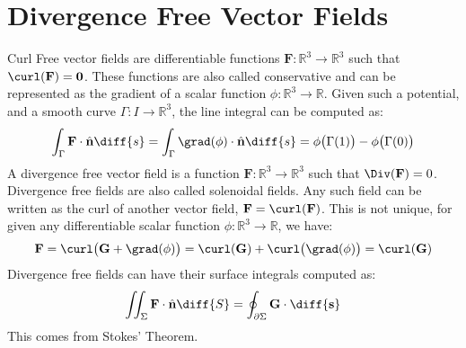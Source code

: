 \documentclass[crop=false,class=book,oneside]{standalone}
\begin{document}
    \section{Divergence Free Vector Fields}
        Curl Free vector fields are differentiable functions
        $\mathbf{F}:\mathbb{R}^{3}\rightarrow\mathbb{R}^{3}$ such
        that $\curl(\mathbf{F})=\mathbf{0}$. These functions are
        also called conservative and can be represented as the
        gradient of a scalar function
        $\phi:\mathbb{R}^{3}\rightarrow\mathbb{R}$. Given such a
        potential, and a smooth curve
        $\Gamma:I\rightarrow\mathbb{R}^{3}$, the line integral
        can be computed as:
        \begin{equation}
            \int_{\Gamma}\mathbf{F}\cdot\hat{\mathbf{n}}\diff{s}
            =\int_{\Gamma}\grad(\phi)\cdot\hat{\mathbf{n}}\diff{s}
            =\phi\big(\Gamma(1)\big)-\phi\big(\Gamma(0)\big)
        \end{equation}
        A divergence free vector field is a function
        $\mathbf{F}:\mathbb{R}^{3}\rightarrow\mathbb{R}^{3}$ such
        that $\Div(\mathbf{F})=0$. Divergence free fields are also
        called solenoidal fields. Any such field can be written
        as the curl of another vector field,
        $\mathbf{F}=\curl(\mathbf{F})$. This is not unique, for given
        any differentiable scalar function
        $\phi:\mathbb{R}^{3}\rightarrow\mathbb{R}$, we have:
        \begin{equation}
            \mathbf{F}=\curl\big(\mathbf{G}+\grad(\phi)\big)
                =\curl(\mathbf{G})+\curl\big(\grad(\phi)\big)
                =\curl(\mathbf{G})
        \end{equation}
        Divergence free fields can have their surface integrals
        computed as:
        \begin{equation}
            \iint_{\Sigma}\mathbf{F}\cdot\hat{\mathbf{n}}\diff{S}=
            \oint_{\partial\Sigma}\mathbf{G}\cdot\mathbf{\diff{s}}
        \end{equation}
        This comes from Stokes' Theorem.
\end{document}
